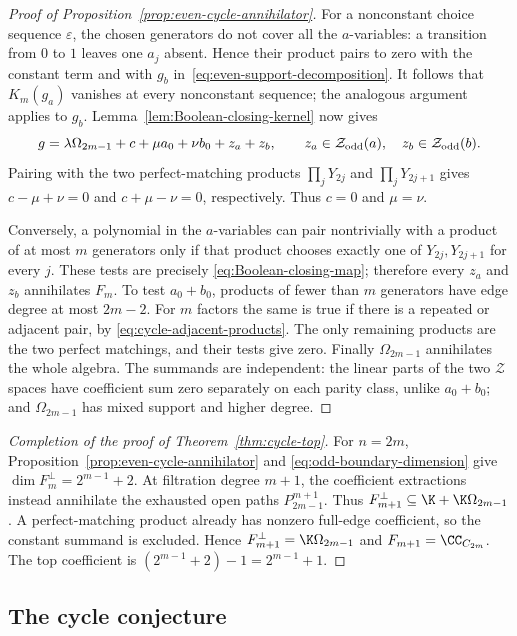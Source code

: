 \begin{proof}[Proof of Proposition~\ref{prop:even-cycle-annihilator}]
For a nonconstant choice sequence $\varepsilon$, the chosen generators
do not cover all the $a$-variables: a transition from $0$ to $1$ leaves
one $a_j$ absent. Hence their product pairs to zero with the constant
term and with $g_b$ in~\eqref{eq:even-support-decomposition}.
It follows that $K_m(g_a)$ vanishes at every nonconstant sequence;
the analogous argument applies to $g_b$.
Lemma~\ref{lem:Boolean-closing-kernel} now gives
\[
g=\lambda\Omega_{2m-1}+c+\mu a_0+\nu b_0+z_a+z_b,
\qquad z_a\in\mathcal Z_{\rm odd}(a),\quad
z_b\in\mathcal Z_{\rm odd}(b).
\]
Pairing with the two perfect-matching products
$\prod_jY_{2j}$ and $\prod_jY_{2j+1}$ gives
$c-\mu+\nu=0$ and $c+\mu-\nu=0$, respectively.
Thus $c=0$ and $\mu=\nu$.

Conversely, a polynomial in the $a$-variables can pair nontrivially with
a product of at most $m$ generators only if that product chooses exactly
one of $Y_{2j},Y_{2j+1}$ for every $j$. These tests are precisely
\eqref{eq:Boolean-closing-map}; therefore every $z_a$ and $z_b$
annihilates $F_m$. To test $a_0+b_0$, products of fewer than $m$
generators have edge degree at most $2m-2$. For $m$ factors the same is
true if there is a repeated or adjacent pair, by
\eqref{eq:cycle-adjacent-products}. The only remaining products are the
two perfect matchings, and their tests give zero. Finally
$\Omega_{2m-1}$ annihilates the whole algebra.
The summands are independent: the linear parts of the two $\mathcal Z$
spaces have coefficient sum zero separately on each parity class, unlike
$a_0+b_0$; and $\Omega_{2m-1}$ has mixed support and higher degree.
\end{proof}

\begin{proof}[Completion of the proof of Theorem~\ref{thm:cycle-top}]
For $n=2m$, Proposition~\ref{prop:even-cycle-annihilator} and
\eqref{eq:odd-boundary-dimension} give
$\dim F_m^\perp=2^{m-1}+2$.
At filtration degree $m+1$, the coefficient extractions instead
annihilate the exhausted open paths $P_{2m-1}^{m+1}$.
Thus $F_{m+1}^\perp\subseteq\K+\K\Omega_{2m-1}$.
A perfect-matching product already has nonzero full-edge coefficient,
so the constant summand is excluded. Hence
$F_{m+1}^\perp=\K\Omega_{2m-1}$ and
$F_{m+1}=\CC_{C_{2m}}$. The top coefficient is
$(2^{m-1}+2)-1=2^{m-1}+1$.
\end{proof}

\subsection{The cycle conjecture}
\label{sec:cycle-conjecture}

